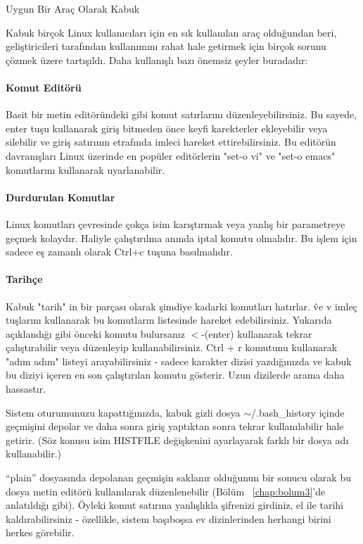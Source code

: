 \begin{section}{Uygun Bir Araç Olarak Kabuk}

Kabuk birçok Linux kullanıcıları için en sık kullanılan araç olduğundan beri, geliştiricileri tarafından kullanımını rahat hale getirmek için birçok sorunu çözmek üzere tartışıldı. Daha kullanışlı bazı önemsiz şeyler buradadır:

\paragraph{Komut Editörü} {Basit bir metin editöründeki gibi komut satırlarını düzenleyebilirsiniz. Bu sayede, enter tuşu kullanarak giriş bitmeden önce keyfi karekterler ekleyebilir veya silebilir ve giriş satırının etrafında imleci hareket ettirebilirsiniz. Bu editörün davranışları Linux üzerinde en popüler editörlerin "set-o vi" ve "set-o emacs" komutlarını kullanarak uyarlanabilir.}
\paragraph{Durdurulan Komutlar}{Linux komutları çevresinde çokça isim karıştırmak veya yanlış bir parametreye geçmek kolaydır. Haliyle çalıştırılma anında iptal komutu olmalıdır. Bu işlem için sadece eş zamanlı olarak Ctrl+c tuşuna basılmalıdır.}
\paragraph{Tarihçe}{Kabuk "tarih" in bir parçası olarak şimdiye kadarki komutları hatırlar. \^ ve v imleç tuşlarını kullanarak bu komutların listesinde hareket edebilirsiniz. Yukarıda açıklandığı gibi önceki komutu bulursanız $<$-(enter) kullanarak tekrar çalıştırabilir veya düzenleyip kullanabilirsiniz. Ctrl + r komutunu kullanarak "adım adım" listeyi arayabilirsiniz - sadece karakter dizisi yazdığınızda ve kabuk bu diziyi içeren en son çalıştırılan komutu gösterir. Uzun dizilerde arama daha hassastır.}

Sistem oturumunuzu kapattığınızda, kabuk gizli dosya $\sim$/.bash\_history içinde geçmişini depolar ve daha sonra giriş yaptıktan sonra tekrar kullanılabilir hale getirir. (Söz konusu isim HISTFILE değişkenini ayarlayarak farklı bir dosya adı kullanabilir.)

“plain” dosyasında depolanan geçmişin saklanır olduğunun bir sonucu olarak bu dosya metin editörü kullanılarak düzenlenebilir (Bölüm ~\ref{chap:bolum3}'de anlatıldığı gibi). Öyleki
komut satırına yanlışlıkla şifrenizi girdiniz, el ile tarihi kaldırabilirsiniz - özellikle, sistem başıboşsa ev dizinlerinden herhangi birini herkes görebilir.

\end{section}
